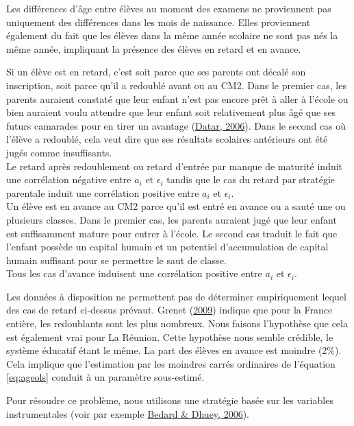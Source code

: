 \documentclass[
]{book}
\begin{document}
\quad Les différences d'âge entre élèves au moment des examens ne proviennent pas uniquement des différences dans les mois de naissance. Elles proviennent également du fait que les élèves dans la même année scolaire ne sont pas nés la même année, impliquant la présence des élèves en retard et en avance.

\quad Si un élève est en retard, c'est soit parce que ses parents ont décalé son inscription, soit parce qu'il a redoublé avant ou au CM2. Dans le premier cas, les parents auraient constaté que leur enfant n'est pas encore prêt à aller à l'école ou bien auraient voulu attendre que leur enfant soit relativement plus âgé que ses futurs camarades pour en tirer un avantage (\protect\hyperlink{ref-DAT:06}{Datar, 2006}). Dans le second cas où l'élève a redoublé, cela veut dire que ses résultats scolaires antérieurs ont été jugés comme insuffisants.\\
Le retard après redoublement ou retard d'entrée par manque de maturité induit une corrélation négative entre \(a_i\) et \(\epsilon_i\) tandis que le cas du retard par stratégie parentale induit une corrélation positive entre \(a_i\) et \(\epsilon_i\).\\

\quad Un élève est en avance au CM2 parce qu'il est entré en avance ou a sauté une ou plusieurs classes. Dans le premier cas, les parents auraient jugé que leur enfant est suffisamment mature pour entrer à l'école. Le second cas traduit le fait que l'enfant possède un capital humain et un potentiel d'accumulation de capital humain suffisant pour se permettre le saut de classe.\\
Tous les cas d'avance induisent une corrélation positive entre \(a_i\) et \(\epsilon_i\).

\quad Les données à disposition ne permettent pas de déterminer empiriquement lequel des cas de retard ci-dessus prévaut. Grenet (\protect\hyperlink{ref-GRE:09}{2009}) indique que pour la France entière, les redoublants sont les plus nombreux. Nous faisons l'hypothèse que cela est également vrai pour La Réunion. Cette hypothèse nous semble crédible, le système éducatif étant le même. La part des élèves en avance est moindre (2\%). Cela implique que l'estimation par les moindres carrés ordinaires de l'équation \eqref{eq:ageols} conduit à un paramètre sous-estimé.

\quad Pour résoudre ce problème, nous utilisons une stratégie basée sur les variables instrumentales (voir par exemple \protect\hyperlink{ref-BED:DHU:06}{Bedard \& Dhuey, 2006}).
\end{document}
